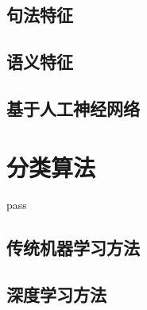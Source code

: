 \subsection{句法特征} %


\subsection{语义特征} %


\subsection{基于人工神经网络}



\section{分类算法}

pass

\subsection{传统机器学习方法}


\subsection{深度学习方法}


